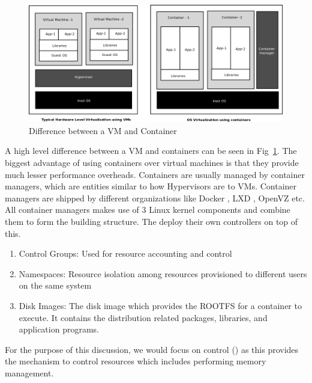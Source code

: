      \begin{figure}
      \centering
      \includegraphics[width=1\textwidth]{images/background/container_vs_vm.png}
      \caption{Difference between a VM and Container}
      \label{img:difference}
    \end{figure}

A high level difference between a VM and containers can be seen in Fig~\ref{img:difference}. The biggest advantage of using containers over 
virtual machines is that they provide much lesser performance overheads. Containers are usually managed by container managers, which are 
entities similar to how Hypervisors are to VMs. Container managers are shipped by different organizations like Docker \cite{docker}, LXD 
\cite{lxd}, OpenVZ \cite{kolyshkin2006virtualization} etc. All container managers makes use of 3 Linux kernel components and combine 
them to form the building structure. The deploy their own controllers on top of this. 
    
    \begin{enumerate}
      \item Control Groups: Used for resource accounting and control
      \item Namespaces: Resource isolation among resources provisioned to different users on the same system
      \item Disk Images: The disk image which provides the ROOTFS for a container to execute. It contains the distribution related 
packages, libraries, and application programs.
    \end{enumerate}
    
    For the purpose of this discussion, we would focus on control \cg{} (\cg{}) as this provides the mechanism to control resources 
which includes performing memory management.

  
